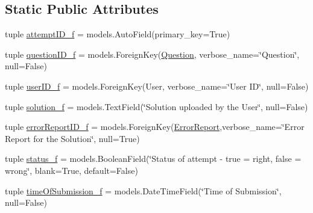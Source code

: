\subsection*{Static Public Attributes}
\begin{DoxyCompactItemize}
\item 
tuple \hyperlink{class_ecodena_1_1_attempt_1_1models_1_1_attempt_ac5cbf660353ba1658687b993929d0cbd}{attemptID\_\-f} = models.AutoField(primary\_\-key=True)
\item 
tuple \hyperlink{class_ecodena_1_1_attempt_1_1models_1_1_attempt_acbd8a4ec39ee2520f9540c23bf78982b}{questionID\_\-f} = models.ForeignKey(\hyperlink{class_ecodena_1_1_question_1_1models_1_1_question}{Question}, verbose\_\-name=\char`\"{}Question\char`\"{}, null=False)
\item 
tuple \hyperlink{class_ecodena_1_1_attempt_1_1models_1_1_attempt_ac1f50e1b0c5ccfc3e16fff6b5069c01e}{userID\_\-f} = models.ForeignKey(User, verbose\_\-name=\char`\"{}User ID\char`\"{}, null=False)
\item 
tuple \hyperlink{class_ecodena_1_1_attempt_1_1models_1_1_attempt_a1b63280fe142dfde79c43df974cf42dd}{solution\_\-f} = models.TextField(\char`\"{}Solution uploaded by the User\char`\"{}, null=False)
\item 
tuple \hyperlink{class_ecodena_1_1_attempt_1_1models_1_1_attempt_ae2cd37972f3706554532bf2e958c5b7d}{errorReportID\_\-f} = models.ForeignKey(\hyperlink{class_ecodena_1_1_attempt_1_1models_1_1_error_report}{ErrorReport},verbose\_\-name=\char`\"{}Error Report for the Solution\char`\"{}, null=True)
\item 
tuple \hyperlink{class_ecodena_1_1_attempt_1_1models_1_1_attempt_a59ab4c46b6d8e82311f400a9f86398f3}{status\_\-f} = models.BooleanField(\char`\"{}Status of attempt -\/ true = right, false = wrong\char`\"{}, blank=True, default=False)
\item 
tuple \hyperlink{class_ecodena_1_1_attempt_1_1models_1_1_attempt_ae384b3bf053f841002aa0232bccfafaa}{timeOfSubmission\_\-f} = models.DateTimeField(\char`\"{}Time of Submission\char`\"{}, null=False)
\end{DoxyCompactItemize}
